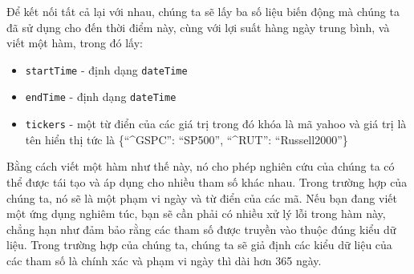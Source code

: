 Để kết nối tất cả lại với nhau, chúng ta sẽ lấy ba số liệu biến động mà chúng ta đã sử dụng cho đến thời điểm này, cùng với lợi suất hàng ngày trung bình, và viết một hàm, trong đó lấy:

\begin{itemize}
  \item \texttt{startTime} - định dạng \texttt{dateTime} 
  \item \texttt{endTime} - định dạng \texttt{dateTime} 
  \item \texttt{tickers} - một từ điển của các giá trị trong đó khóa là mã yahoo và giá trị là tên hiển thị tức là \{``\textasciicircum{}GSPC'': ``SP500'', ``\textasciicircum{}RUT'': ``Russell2000''\}
\end{itemize}
Bằng cách viết một hàm như thế này, nó cho phép nghiên cứu của chúng ta có thể được tái tạo và áp dụng cho nhiều tham số khác nhau. Trong trường hợp của chúng ta, nó sẽ là một phạm vi ngày và từ điển của các mã. Nếu bạn đang viết một ứng dụng nghiêm túc, bạn sẽ cần phải có nhiều xử lý lỗi trong hàm này, chẳng hạn như đảm bảo rằng các tham số được truyền vào thuộc đúng kiểu dữ liệu. Trong trường hợp của chúng ta, chúng ta sẽ giả định các kiểu dữ liệu của các tham số là chính xác và phạm vi ngày thì dài hơn 365 ngày.

